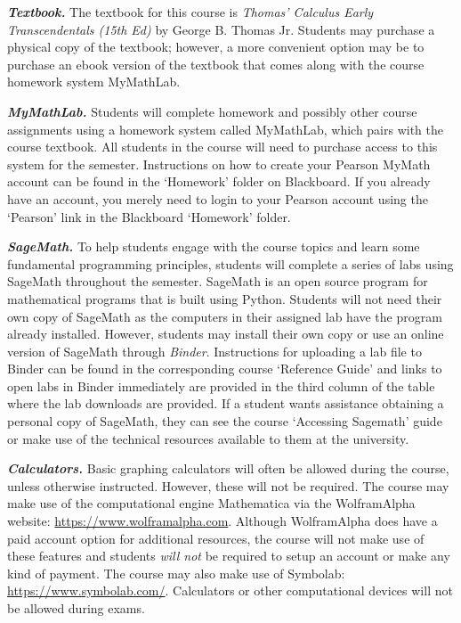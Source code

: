 \documentclass[11pt,letterpaper]{article}
\begin{document}

{\itshape\bfseries\color{scred}Textbook.} The textbook for this course is {\itshape Thomas' Calculus Early Transcendentals (15th Ed)} by George B. Thomas Jr. Students may purchase a physical copy of the textbook; however, a more convenient option may be to purchase an ebook version of the textbook that comes along with the course homework system MyMathLab. \pspace

{\itshape\bfseries\color{scred}MyMathLab.} Students will complete homework and possibly other course assignments using a homework system called MyMathLab, which pairs with the course textbook. All students in the course will need to purchase access to this system for the semester. Instructions on how to create your Pearson MyMath account can be found in the `Homework' folder on Blackboard. If you already have an account, you merely need to login to your Pearson account using the `Pearson' link in the Blackboard `Homework' folder. \pspace

{\itshape\bfseries\color{scred}SageMath.} To help students engage with the course topics and learn some fundamental programming principles, students will complete a series of labs using SageMath throughout the semester. SageMath is an open source program for mathematical programs that is built using Python. Students will not need their own copy of SageMath as the computers in their assigned lab have the program already installed. However, students may install their own copy or use an online version of SageMath through \textit{Binder}. Instructions for uploading a lab file to Binder can be found in the corresponding course `Reference Guide' and links to open labs in Binder immediately are provided in the third column of the table where the lab downloads are provided. If a student wants assistance obtaining a personal copy of SageMath, they can see the course `Accessing Sagemath' guide or make use of the technical resources available to them at the university. \pspace

{\itshape\bfseries\color{scred}Calculators.} Basic graphing calculators will often be allowed during the course, unless otherwise instructed. However, these will not be required. The course may make use of the computational engine Mathematica via the WolframAlpha website: \url{https://www.wolframalpha.com}. Although WolframAlpha does have a paid account option for additional resources, the course will not make use of these features and students {\itshape will not} be required to setup an account or make any kind of payment. The course may also make use of Symbolab: \url{https://www.symbolab.com/}. Calculators or other computational devices will not be allowed during exams. 
\sectionbreak
\end{document}
